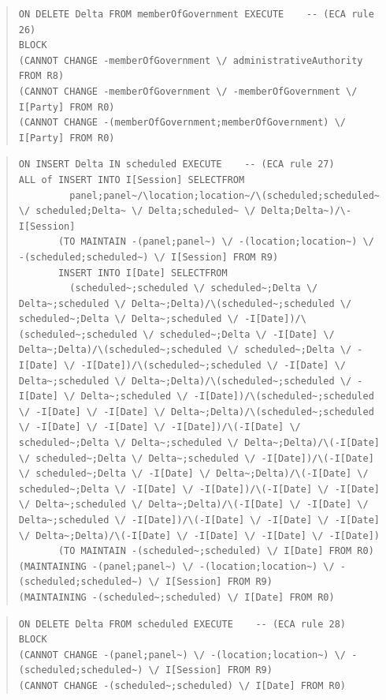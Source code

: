 \documentclass[10pt,a4paper]{report}              %
\theoremstyle{plain}\theorembodyfont{\rmfamily}\newtheorem{definition}{Definition}[section]
\theoremstyle{plain}\theorembodyfont{\rmfamily}\newtheorem{designrule}[definition]{Requirement}
\begin{document}
\begin{quote}
\begin{verbatim}
ON DELETE Delta FROM memberOfGovernment EXECUTE    -- (ECA rule 26)
BLOCK
(CANNOT CHANGE -memberOfGovernment \/ administrativeAuthority FROM R8)
(CANNOT CHANGE -memberOfGovernment \/ -memberOfGovernment \/ I[Party] FROM R0)
(CANNOT CHANGE -(memberOfGovernment;memberOfGovernment) \/ I[Party] FROM R0)
\end{verbatim}
\end{quote}
\begin{quote}
\begin{verbatim}
ON INSERT Delta IN scheduled EXECUTE    -- (ECA rule 27)
ALL of INSERT INTO I[Session] SELECTFROM
         panel;panel~/\location;location~/\(scheduled;scheduled~ \/ scheduled;Delta~ \/ Delta;scheduled~ \/ Delta;Delta~)/\-I[Session]
       (TO MAINTAIN -(panel;panel~) \/ -(location;location~) \/ -(scheduled;scheduled~) \/ I[Session] FROM R9)
       INSERT INTO I[Date] SELECTFROM
         (scheduled~;scheduled \/ scheduled~;Delta \/ Delta~;scheduled \/ Delta~;Delta)/\(scheduled~;scheduled \/ scheduled~;Delta \/ Delta~;scheduled \/ -I[Date])/\(scheduled~;scheduled \/ scheduled~;Delta \/ -I[Date] \/ Delta~;Delta)/\(scheduled~;scheduled \/ scheduled~;Delta \/ -I[Date] \/ -I[Date])/\(scheduled~;scheduled \/ -I[Date] \/ Delta~;scheduled \/ Delta~;Delta)/\(scheduled~;scheduled \/ -I[Date] \/ Delta~;scheduled \/ -I[Date])/\(scheduled~;scheduled \/ -I[Date] \/ -I[Date] \/ Delta~;Delta)/\(scheduled~;scheduled \/ -I[Date] \/ -I[Date] \/ -I[Date])/\(-I[Date] \/ scheduled~;Delta \/ Delta~;scheduled \/ Delta~;Delta)/\(-I[Date] \/ scheduled~;Delta \/ Delta~;scheduled \/ -I[Date])/\(-I[Date] \/ scheduled~;Delta \/ -I[Date] \/ Delta~;Delta)/\(-I[Date] \/ scheduled~;Delta \/ -I[Date] \/ -I[Date])/\(-I[Date] \/ -I[Date] \/ Delta~;scheduled \/ Delta~;Delta)/\(-I[Date] \/ -I[Date] \/ Delta~;scheduled \/ -I[Date])/\(-I[Date] \/ -I[Date] \/ -I[Date] \/ Delta~;Delta)/\(-I[Date] \/ -I[Date] \/ -I[Date] \/ -I[Date])
       (TO MAINTAIN -(scheduled~;scheduled) \/ I[Date] FROM R0)
(MAINTAINING -(panel;panel~) \/ -(location;location~) \/ -(scheduled;scheduled~) \/ I[Session] FROM R9)
(MAINTAINING -(scheduled~;scheduled) \/ I[Date] FROM R0)
\end{verbatim}
\end{quote}
\begin{quote}
\begin{verbatim}
ON DELETE Delta FROM scheduled EXECUTE    -- (ECA rule 28)
BLOCK
(CANNOT CHANGE -(panel;panel~) \/ -(location;location~) \/ -(scheduled;scheduled~) \/ I[Session] FROM R9)
(CANNOT CHANGE -(scheduled~;scheduled) \/ I[Date] FROM R0)
\end{verbatim}
\end{quote}
\end{document}
